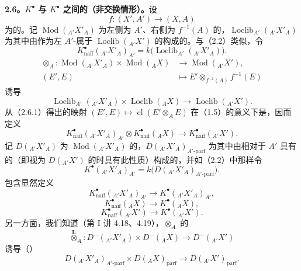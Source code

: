 \textbf{2.6。$K^\bullet$ 与 $K^\bullet$ 之间的（非交换情形）。}设
\[f:(X',A')\longrightarrow(X,A)\]
为的。记 $\operatorname{Mod}({}_{A'}X'_A)$ 为左侧为 $A'$、右侧为 $f^{-1}(A)$ 的，$\operatorname{Loclib}_{A'}({}_{A'}X'_A)$ 为其中由作为左 $A'$-属于 $\operatorname{Loclib}({}_{A'}X')$ 的构成的。与（2.2）类似，令
\[K^\bullet_{\text{naïf}}({}_{A'}X'_A)_{A'}=k\bigl(\operatorname{Loclib}_{A'}({}_{A'}X'_A)\bigr).\]
\begin{align*}
\otimes_A:\operatorname{Mod}({}_{A'}X'_A)\times\operatorname{Mod}({}_AX)&\longrightarrow\operatorname{Mod}({}_{A'}X'),\\
(E',E)&\longmapsto E'\otimes_{f^{-1}(A)}f^{-1}(E)
\end{align*}
诱导
\[\operatorname{Loclib}_{A'}({}_{A'}X'_A)\times\operatorname{Loclib}({}_AX)\longrightarrow\operatorname{Loclib}({}_{A'}X').\tag{2.6.1}\]
从（2.6.1）得出的映射 $(E',E)\mapsto\operatorname{cl}(E'\otimes_AE)$ 在（1.5）的意义下是，因而定义
\[K^\bullet_{\text{naïf}}({}_{A'}X'_A)_{A'}\otimes K^\bullet_{\text{naïf}}({}_AX)\longrightarrow K^\bullet_{\text{naïf}}({}_{A'}X').\tag{2.6.2}\]
记 $D({}_{A'}X'_A)$ 为 $\operatorname{Mod}({}_{A'}X'_A)$ 的，$D({}_{A'}X'_A)_{A'\text{-}\mathrm{parf}}$ 为其中由相对于 $A'$ 具有的（即视为 $D({}_{A'}X')$ 的时具有此性质）构成的，并如（2.2）中那样令
\[K^\bullet({}_{A'}X'_A)_{A'}=k\bigl(D({}_{A'}X'_A)_{A'\text{-}\mathrm{parf}}\bigr).\]
包含显然定义
\[K^\bullet_{\text{naïf}}({}_{A'}X'_A)_{A'}\longrightarrow K^\bullet({}_{A'}X'_A)_{A'},\tag{2.6.3.1}\]
\[K^\bullet_{\text{naïf}}({}_AX)\longrightarrow K^\bullet({}_AX),\tag{2.6.3.2}\]
\[K^\bullet_{\text{naïf}}({}_{A'}X')\longrightarrow K^\bullet({}_{A'}X').\tag{2.6.3.3}\]
另一方面，我们知道（第 I 讲 4.18、4.19），$\otimes_A$ 的
\[\mathbin{\overset{\mathbf L}{\otimes}}_A:D^-({}_{A'}X'_A)\times D^-({}_AX)\longrightarrow D^-({}_{A'}X')\]
诱导（）
\[D({}_{A'}X'_A)_{A'\text{-}\mathrm{parf}}\times D({}_AX)_{\mathrm{parf}}\longrightarrow D({}_{A'}X')_{\mathrm{parf}}.\tag{2.6.4}\]
